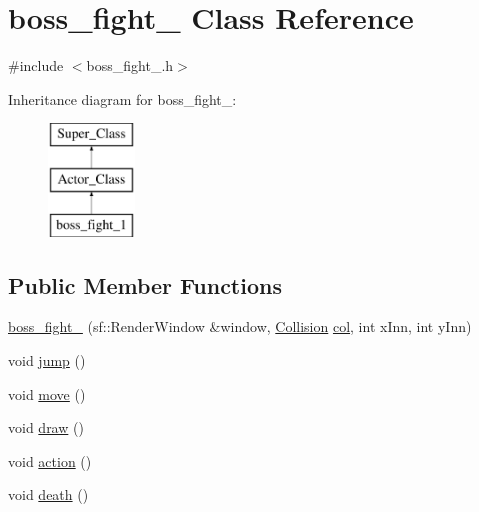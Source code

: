 \hypertarget{classboss__fight__1}{}\section{boss\+\_\+fight\+\_ Class Reference}
\label{classboss__fight__1}


{\ttfamily \#include $<$boss\+\_\+fight\+\_.\+h$>$}

Inheritance diagram for boss\+\_\+fight\+\_\+:\begin{figure}[H]
\begin{center}
\leavevmode
\includegraphics[height=3.000000cm]{classboss__fight__1}
\end{center}
\end{figure}
\subsection*{Public Member Functions}
\begin{DoxyCompactItemize}
\item 
\hyperlink{classboss__fight__1_a189fa85c3b23bb89776bebaa9f8dce70}{boss\+\_\+fight\+\_} (sf\+::\+Render\+Window \&window, \hyperlink{class_collision}{Collision} \hyperlink{classboss__fight__1_a7419d00c4958618eaffb181617305d22}{col}, int x\+Inn, int y\+Inn)
\item 
void \hyperlink{classboss__fight__1_a363121fd16c5d41889f96405544bccc1}{jump} ()
\item 
void \hyperlink{classboss__fight__1_a2ecde11495757971f23f45e78f23c5f7}{move} ()
\item 
void \hyperlink{classboss__fight__1_a83b20e761e3f8781c8fee8d2be5442b0}{draw} ()
\item 
void \hyperlink{classboss__fight__1_a73c37c9ddf1b6370d1a9e2b5c9cd9b05}{action} ()
\item 
void \hyperlink{classboss__fight__1_a158e53600a084e13047732d89a0f4299}{death} ()
\end{DoxyCompactItemize}

